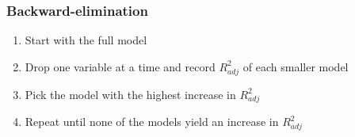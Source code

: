 
\begin{frame}
\frametitle{Backward-elimination}

\begin{enumerate}

\item Start with the full model
\item Drop one variable at a time and record $R^2_{adj}$ of each smaller model
\item Pick the model with the highest increase in $R^2_{adj}$
\item Repeat until none of the models yield an increase in $R^2_{adj}$

\end{enumerate}

\end{frame}


